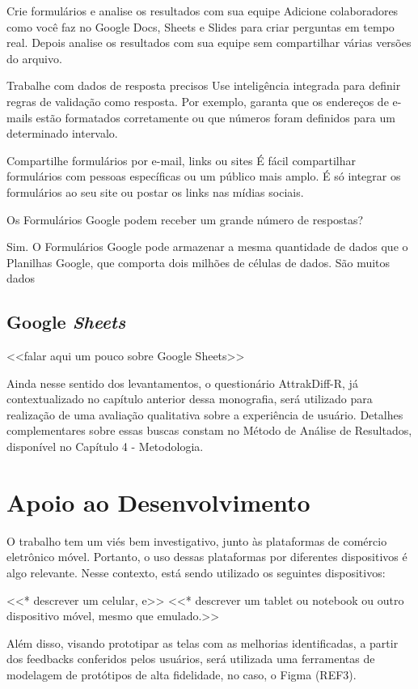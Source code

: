 Crie formulários e analise os resultados com sua equipe
Adicione colaboradores como você faz no Google Docs, Sheets e Slides para criar perguntas em tempo real. Depois analise os resultados com sua equipe sem compartilhar várias versões do arquivo.

Trabalhe com dados de resposta precisos
Use inteligência integrada para definir regras de validação como resposta. Por exemplo, garanta que os endereços de e-mails estão formatados corretamente ou que números foram definidos para um determinado intervalo.

Compartilhe formulários por e-mail, links ou sites
É fácil compartilhar formulários com pessoas específicas ou um público mais amplo. É só integrar os formulários ao seu site ou postar os links nas mídias sociais.

Os Formulários Google podem receber um grande número de respostas?

Sim. O Formulários Google pode armazenar a mesma quantidade de dados que o Planilhas Google, que comporta dois milhões de células de dados. São muitos dados

\subsection{Google \textit{Sheets}}
\label{GoogleSheets}
<<falar aqui um pouco sobre Google Sheets>>

Ainda nesse sentido dos levantamentos, o questionário AttrakDiff-R, já contextualizado no capítulo anterior dessa monografia, será utilizado para realização de uma avaliação qualitativa sobre a experiência de usuário. Detalhes complementares sobre essas buscas constam no Método de Análise de Resultados, disponível no Capítulo 4 - Metodologia.


\section{Apoio ao Desenvolvimento} \label{desenvolvimento}

O trabalho tem um viés bem investigativo, junto às plataformas de comércio eletrônico móvel. Portanto, o uso dessas plataformas por diferentes dispositivos é algo relevante. Nesse contexto, está sendo utilizado os seguintes dispositivos:

<<* descrever um celular, e>>
<<* descrever um tablet ou notebook ou outro dispositivo móvel, mesmo que emulado.>>

Além disso, visando prototipar as telas com as melhorias identificadas, a partir dos feedbacks conferidos pelos usuários, será utilizada uma ferramentas de modelagem de protótipos de alta fidelidade, no caso, o Figma (REF3).

